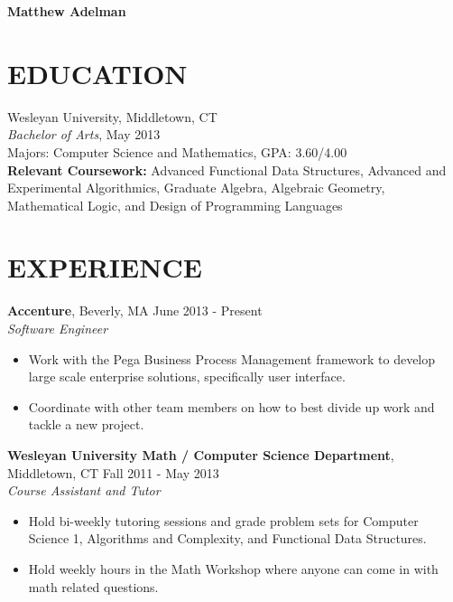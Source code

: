 \documentclass[11pt]{res} %
\begin{document}
 


{\bf\Large Matthew Adelman}

\address{27 Warner Street $\bullet$ Apt. \#2 $\bullet$ Somerville, MA 02144 \\ 
        (201) 323-2719 $\bullet$ mxadelman@gmail.com $\bullet$ 
        http://madelman.org}

\address{}

\begin{resume}

\section{EDUCATION}
 \noindent Wesleyan University, Middletown, CT \\
{\it Bachelor of Arts}, May 2013 \\
Majors: Computer Science and Mathematics, GPA: 3.60/4.00 \\
{\bf Relevant Coursework:} Advanced Functional Data Structures, Advanced and 
Experimental Algorithmics, Graduate Algebra, Algebraic Geometry, Mathematical
Logic, and Design of Programming Languages

\section{EXPERIENCE}
{\bf Accenture}, Beverly, MA \hfill June 2013 - Present \\
{\it Software Engineer} 
\vspace{0.01in} %
   \begin{itemize} \itemsep -2pt  %
   \item Work with the Pega Business Process Management framework to develop 
   large scale enterprise solutions,
   specifically user interface.
   \item Coordinate with other team members on how to best divide up work and
   tackle a new project.
   \end{itemize}


{\bf Wesleyan University Math / Computer Science Department}, Middletown, CT 
\hfill Fall 2011 - May 2013 \\ 
{\it Course Assistant and Tutor} \\
\vspace{-0.17in}
 \begin{itemize} \itemsep -2pt
   \item Hold bi-weekly tutoring sessions and grade problem sets for Computer
   Science 1, Algorithms and Complexity, and Functional Data Structures.  
   \item Hold weekly hours in the Math Workshop where anyone can come in with
   math related questions.  
   \end{itemize} 


\end{resume}
\end{document}
